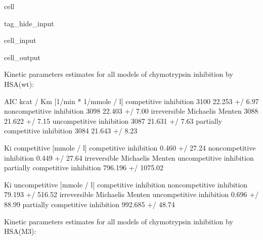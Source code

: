 \documentclass[letterpaper,10pt,english]{jupyterBook}
\begin{document}
\begin{sphinxuseclass}{cell}
\begin{sphinxuseclass}{tag_hide_input}
\begin{sphinxVerbatimInput}
\begin{sphinxuseclass}{cell_input}
\end{sphinxuseclass}\end{sphinxVerbatimInput}
\begin{sphinxVerbatimOutput}

\begin{sphinxuseclass}{cell_output}
\begin{sphinxVerbatim}[commandchars=\\\{\}]
Kinetic parameters estimates for all models of chymotrypsin inhibition by HSA(wt):
\end{sphinxVerbatim}

\begin{sphinxVerbatim}[commandchars=\\\{\}]
                                   AIC kcat / Km [1/min * 1/mmole / l]  \PYGZbs{}
competitive inhibition           \PYGZhy{}3100                22.253 +/\PYGZhy{} 6.97\PYGZpc{}   
non\PYGZhy{}competitive inhibition       \PYGZhy{}3098                22.403 +/\PYGZhy{} 7.00\PYGZpc{}   
irreversible Michaelis Menten    \PYGZhy{}3088                21.622 +/\PYGZhy{} 7.15\PYGZpc{}   
uncompetitive inhibition         \PYGZhy{}3087                21.631 +/\PYGZhy{} 7.63\PYGZpc{}   
partially competitive inhibition \PYGZhy{}3084                21.643 +/\PYGZhy{} 8.23\PYGZpc{}   

                                 Ki competitive [mmole / l]  \PYGZbs{}
competitive inhibition                     0.460 +/\PYGZhy{} 27.24\PYGZpc{}   
non\PYGZhy{}competitive inhibition                 0.449 +/\PYGZhy{} 27.64\PYGZpc{}   
irreversible Michaelis Menten                             \PYGZhy{}   
uncompetitive inhibition                                  \PYGZhy{}   
partially competitive inhibition       796.196 +/\PYGZhy{} 1075.02\PYGZpc{}   

                                 Ki uncompetitive [mmole / l]  
competitive inhibition                                      \PYGZhy{}  
non\PYGZhy{}competitive inhibition                 79.193 +/\PYGZhy{} 516.52\PYGZpc{}  
irreversible Michaelis Menten                               \PYGZhy{}  
uncompetitive inhibition                     0.696 +/\PYGZhy{} 88.99\PYGZpc{}  
partially competitive inhibition           992.685 +/\PYGZhy{} 48.74\PYGZpc{}  
\end{sphinxVerbatim}

\begin{sphinxVerbatim}[commandchars=\\\{\}]
Kinetic parameters estimates for all models of chymotrypsin inhibition by HSA(M3):
\end{sphinxVerbatim}


\end{sphinxuseclass}
\end{sphinxVerbatimOutput}
\end{sphinxuseclass}
\end{sphinxuseclass}
\end{document}
